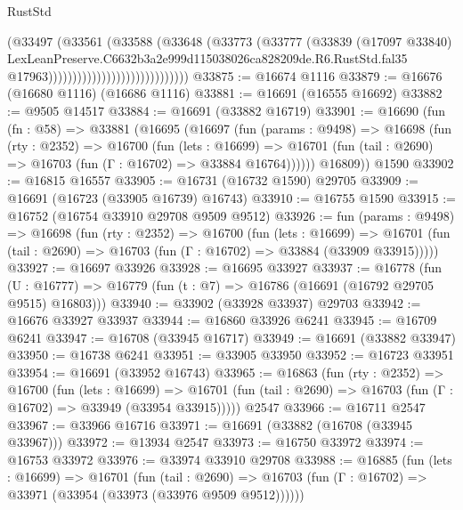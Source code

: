 \begin{lexlean}{RustStd}
\begin{coremodule}
                                                (@33497
                                                  (@33561
                                                    (@33588
                                                      (@33648
                                                        (@33773
                                                          (@33777
                                                            (@33839
                                                              (@17097 @33840)
                                                              LexLeanPreserve.C6632b3a2e999d115038026ca828209de.R6.RustStd.fal35
                                                              @17963)))))))))))))))))))))))))))))
@33875 := @16674 @1116
@33879 := @16676 (@16680 @1116) (@16686 @1116)
@33881 := @16691 (@16555 @16692)
@33882 := @9505 @14517
@33884 := @16691 (@33882 @16719)
@33901 := @16690
    (fun (fn : @58) =>
    @33881
      (@16695
        (@16697
          (fun (params : @9498) =>
          @16698
            (fun (rty : @2352) =>
            @16700
              (fun (lets : @16699) =>
              @16701 (fun (tail : @2690) => @16703 (fun (Γ : @16702) => @33884 @16764))))))
        @16809))
    @1590
@33902 := @16815 @16557
@33905 := @16731 (@16732 @1590) @29705
@33909 := @16691 (@16723 (@33905 @16739) @16743)
@33910 := @16755 @1590
@33915 := @16752 (@16754 @33910 @29708 @9509 @9512)
@33926 := fun (params : @9498) =>
  @16698
    (fun (rty : @2352) =>
    @16700
      (fun (lets : @16699) =>
      @16701 (fun (tail : @2690) => @16703 (fun (Γ : @16702) => @33884 (@33909 @33915)))))
@33927 := @16697 @33926
@33928 := @16695 @33927
@33937 := @16778
    (fun (U : @16777) => @16779 (fun (t : @7) => @16786 (@16691 (@16792 @29705 @9515) @16803)))
@33940 := @33902 (@33928 @33937) @29703
@33942 := @16676 @33927 @33937
@33944 := @16860 @33926 @6241
@33945 := @16709 @6241
@33947 := @16708 (@33945 @16717)
@33949 := @16691 (@33882 @33947)
@33950 := @16738 @6241
@33951 := @33905 @33950
@33952 := @16723 @33951
@33954 := @16691 (@33952 @16743)
@33965 := @16863
    (fun (rty : @2352) =>
    @16700
      (fun (lets : @16699) =>
      @16701 (fun (tail : @2690) => @16703 (fun (Γ : @16702) => @33949 (@33954 @33915)))))
    @2547
@33966 := @16711 @2547
@33967 := @33966 @16716
@33971 := @16691 (@33882 (@16708 (@33945 @33967)))
@33972 := @13934 @2547
@33973 := @16750 @33972
@33974 := @16753 @33972
@33976 := @33974 @33910 @29708
@33988 := @16885
    (fun (lets : @16699) =>
    @16701
      (fun (tail : @2690) =>
      @16703 (fun (Γ : @16702) => @33971 (@33954 (@33973 (@33976 @9509 @9512))))))

\end{coremodule}
\end{lexlean}
